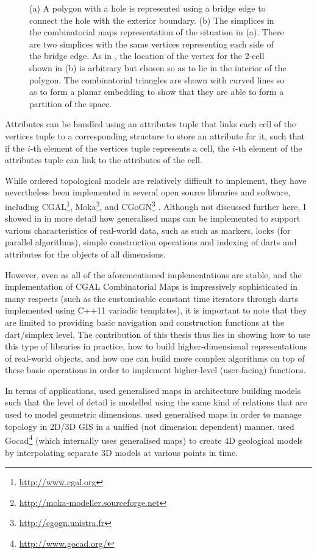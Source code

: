 \begin{figure}[tbp]
{\label{subfig:bridge-2}}
\caption[Representing holes using bridges]{(a) A polygon with a hole is represented using a bridge edge to connect the hole with the exterior boundary.
(b) The simplices in the combinatorial maps representation of the situation in (a).
There are two simplices with the same vertices representing each side of the bridge edge.
As in , the location of the vertex for the 2-cell shown in (b) is arbitrary but chosen so as to lie in the interior of the polygon.
The combinatorial triangles are shown with curved lines so as to form a planar embedding to show that they are able to form a partition of the space.}
\label{fig:bridge}
\end{figure}
Attributes can be handled using an attributes tuple that links each cell of the vertices tuple to a corresponding structure to store an attribute for it, such that if the $i$-th element of the vertices tuple represents a cell, the $i$-th element of the attributes tuple can link to the attributes of the cell.

While ordered topological models are relatively difficult to implement, they have nevertheless been implemented in several open source libraries and software, including CGAL\footnote{\url{http://www.cgal.org}}, Moka\footnote{\url{http://moka-modeller.sourceforge.net}}, and CGoGN\footnote{\url{http://cgogn.unistra.fr}} \citep{Kraemer14}.
Although not discussed further here, I showed in \citet{ArroyoOhori13a} in more detail how generalised maps can be implemented to support various characteristics of real-world data, such as such as markers, locks (for parallel algorithms), simple construction operations and indexing of darts and attributes for the objects of all dimensions.

However, even as all of the aforementioned implementations are stable, and the implementation of CGAL Combinatorial Maps is impressively sophisticated in many respects (such as the customisable constant time iterators through darts implemented using C++11 variadic templates), it is important to note that they are limited to providing basic navigation and construction functions at the dart/simplex level.
The contribution of this thesis thus lies in showing how to use this type of libraries in practice, how to build higher-dimensional representations of real-world objects, and how one can build more complex algorithms on top of these basic operations in order to implement higher-level (user-facing) functions.

In terms of applications, 
\citet{Fradin02} used generalised maps in architecture building models such that the level of detail is modelled using the same kind of relations that are used to model geometric dimensions.
\citet{Thomsen08} used generalised maps in order to manage topology in 2D/3D GIS in a unified (not dimension dependent) manner.
\citet{Le13} used Gocad\footnote{\url{http://www.gocad.org/}} (which internally uses generalised maps) to create 4D geological models by interpolating separate 3D models at various points in time.

